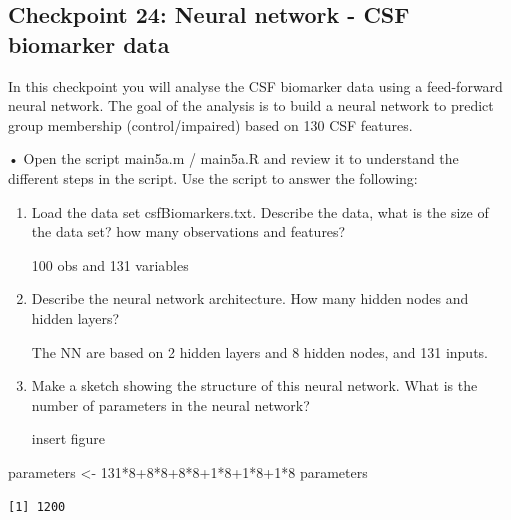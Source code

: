 \documentclass[
  letterpaper,
  DIV=11,
  numbers=noendperiod]{scrartcl}
\newenvironment{Shaded}{\begin{snugshade}}{\end{snugshade}}
\newcommand{\DecValTok}[1]{\textcolor[rgb]{0.68,0.00,0.00}{#1}}
\newcommand{\NormalTok}[1]{\textcolor[rgb]{0.00,0.23,0.31}{#1}}
\newcommand{\OtherTok}[1]{\textcolor[rgb]{0.00,0.23,0.31}{#1}}
\newcommand{\SpecialCharTok}[1]{\textcolor[rgb]{0.37,0.37,0.37}{#1}}
\begin{document}
\hypertarget{checkpoint-24-neural-network---csf-biomarker-data}{%
\subsection{Checkpoint 24: Neural network - CSF biomarker
data}\label{checkpoint-24-neural-network---csf-biomarker-data}}

In this checkpoint you will analyse the CSF biomarker data using a
feed-forward neural network. The goal of the analysis is to build a
neural network to predict group membership (control/impaired) based on
130 CSF features.

• Open the script main5a.m / main5a.R and review it to understand the
different steps in the script. Use the script to answer the following:

\begin{enumerate}
\def\labelenumi{(\alph{enumi})}
\item
  Load the data set csfBiomarkers.txt. Describe the data, what is the
  size of the data set? how many observations and features?

  100 obs and 131 variables
\item
  Describe the neural network architecture. How many hidden nodes and
  hidden layers?

  The NN are based on 2 hidden layers and 8 hidden nodes, and 131
  inputs.
\item
  Make a sketch showing the structure of this neural network. What is
  the number of parameters in the neural network?

  insert figure
\end{enumerate}

\begin{Shaded}
\begin{Highlighting}[]
\NormalTok{parameters }\OtherTok{\textless{}{-}} \DecValTok{131}\SpecialCharTok{*}\DecValTok{8}\SpecialCharTok{+}\DecValTok{8}\SpecialCharTok{*}\DecValTok{8}\SpecialCharTok{+}\DecValTok{8}\SpecialCharTok{*}\DecValTok{8}\SpecialCharTok{+}\DecValTok{1}\SpecialCharTok{*}\DecValTok{8}\SpecialCharTok{+}\DecValTok{1}\SpecialCharTok{*}\DecValTok{8}\SpecialCharTok{+}\DecValTok{1}\SpecialCharTok{*}\DecValTok{8}
\NormalTok{parameters}
\end{Highlighting}
\end{Shaded}

\begin{verbatim}
[1] 1200
\end{verbatim}
\end{document}
